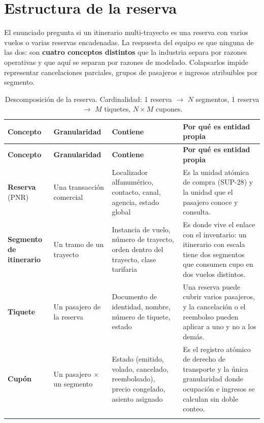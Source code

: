\documentclass[10pt,letterpaper]{article}
\begin{document}
\section{Estructura de la reserva}
\label{sec:reserva}

El enunciado pregunta si un itinerario multi-trayecto es una reserva con varios vuelos o varias reservas encadenadas. La respuesta del equipo es que ninguna de las dos: son \textbf{cuatro conceptos distintos} que la industria separa por razones operativas y que aquí se separan por razones de modelado. Colapsarlos impide representar cancelaciones parciales, grupos de pasajeros e ingresos atribuibles por segmento.

\begin{longtable}{@{}L{2.4cm} L{3.2cm} L{4.2cm} L{6.6cm}@{}}
\toprule \textbf{Concepto} & \textbf{Granularidad} & \textbf{Contiene} & \textbf{Por qué es entidad propia} \\ \midrule \endfirsthead
\toprule \textbf{Concepto} & \textbf{Granularidad} & \textbf{Contiene} & \textbf{Por qué es entidad propia} \\ \midrule \endhead
\textbf{Reserva} (PNR) & Una transacción comercial & Localizador alfanumérico, contacto, canal, agencia, estado global & Es la unidad atómica de compra (SUP-28) y la unidad que el pasajero conoce y consulta. \\
\textbf{Segmento de itinerario} & Un tramo de un trayecto & Instancia de vuelo, número de trayecto, orden dentro del trayecto, clase tarifaria & Es donde vive el enlace con el inventario: un itinerario con escala tiene dos segmentos que consumen cupo en dos vuelos distintos. \\
\textbf{Tiquete} & Un pasajero de la reserva & Documento de identidad, nombre, número de tiquete, estado & Una reserva puede cubrir varios pasajeros, y la cancelación o el reembolso pueden aplicar a uno y no a los demás. \\
\textbf{Cupón} & Un pasajero $\times$ un segmento & Estado (emitido, volado, cancelado, reembolsado), precio congelado, asiento asignado & Es el registro atómico de derecho de transporte y la única granularidad donde ocupación e ingresos se calculan sin doble conteo. \\
\bottomrule
\caption{Descomposición de la reserva. Cardinalidad: 1 reserva $\rightarrow$ $N$ segmentos, 1 reserva $\rightarrow$ $M$ tiquetes, $N \times M$ cupones.}
\end{longtable}
\end{document}

